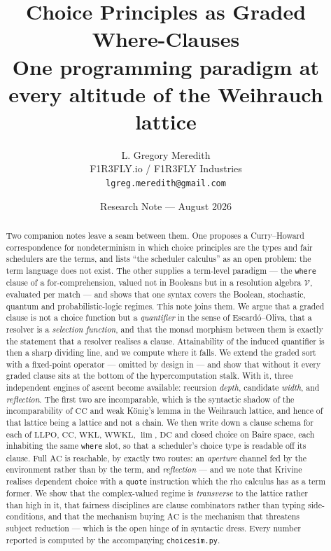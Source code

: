 \documentclass[11pt]{article}
\title{\bfseries Choice Principles as Graded Where-Clauses\\[3pt]
\large One programming paradigm at every altitude of the Weihrauch lattice}
\author{L. Gregory Meredith\\
\small F1R3FLY.io / F1R3FLY Industries\\
\small \texttt{lgreg.meredith@gmail.com}}
\date{Research Note --- August 2026}
\theoremstyle{definition}
\theoremstyle{plain}
\theoremstyle{remark}
\newcommand{\V}{\mathcal{V}}
\newcommand{\AC}{\mathrm{AC}}
\newcommand{\DC}{\mathrm{DC}}
\newcommand{\CC}{\mathrm{CC}}
\newcommand{\LLPO}{\mathrm{LLPO}}
\newcommand{\WKL}{\mathrm{WKL}}
\newcommand{\WWKL}{\mathrm{WWKL}}
\begin{document}
\maketitle

\begin{abstract}
Two companion notes leave a seam between them. One \cite{choicesched} proposes a
Curry--Howard correspondence for nondeterminism in which choice principles are the
types and fair schedulers are the terms, and lists ``the scheduler calculus'' as an
open problem: the term language does not exist. The other \cite{gradedwhere} supplies
a term-level paradigm --- the \texttt{where} clause of a for-comprehension, valued not
in Booleans but in a resolution algebra $\V$, evaluated per match --- and shows that
one syntax covers the Boolean, stochastic, quantum and probabilistic-logic regimes.
This note joins them. We argue that a graded clause is not a choice function but a
\emph{quantifier} in the sense of Escard\'o--Oliva, that a resolver is a
\emph{selection function}, and that the monad morphism between them is exactly the
statement that a resolver realises a clause. Attainability of the induced quantifier
is then a sharp dividing line, and we compute where it falls. We extend the graded
sort with a fixed-point operator --- omitted by design in \cite{gradedwhere} --- and
show that without it every graded clause sits at the bottom of the hypercomputation
stalk. With it, three independent engines of ascent become available: recursion
\emph{depth}, candidate \emph{width}, and \emph{reflection}. The first two are
incomparable, which is the syntactic shadow of the incomparability of $\CC$ and weak
K\"onig's lemma in the Weihrauch lattice, and hence of that lattice being a lattice and
not a chain. We then write down a clause schema for each of
$\LLPO$, $\CC$, $\WKL$, $\WWKL$, $\lim$, $\DC$ and closed choice on Baire space, each
inhabiting the same \texttt{where} slot, so that a scheduler's choice type is readable
off its clause. Full $\AC$ is reachable, by exactly two routes: an \emph{aperture}
channel fed by the environment rather than by the term, and \emph{reflection} --- and
we note that Krivine realises dependent choice with a \texttt{quote} instruction which
the rho calculus has as a term former. We show that the complex-valued regime is
\emph{transverse} to the lattice rather than high in it, that fairness disciplines are
clause combinators rather than typing side-conditions, and that the mechanism buying
$\AC$ is the mechanism that threatens subject reduction --- which is the open hinge of
\cite{agency} in syntactic dress. Every number reported is computed by the
accompanying \texttt{choicesim.py}.
\end{abstract}
\end{document}
